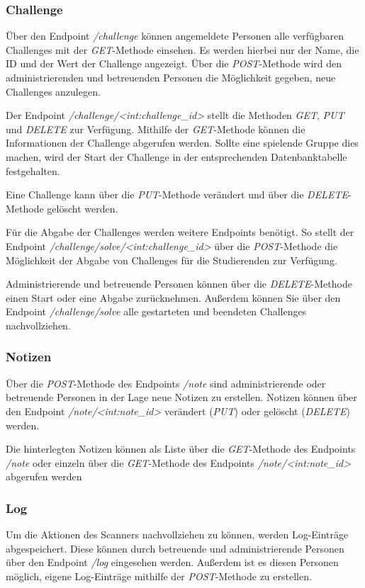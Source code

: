 \subsubsection{Challenge}
Über den Endpoint \textit{/challenge} können angemeldete Personen alle verfügbaren Challenges mit der \textit{GET}-Methode einsehen. Es werden hierbei nur der Name, die ID und der Wert der Challenge angezeigt. Über die \textit{POST}-Methode wird den administrierenden und betreuenden Personen die Möglichkeit gegeben, neue Challenges anzulegen.

Der Endpoint \textit{/challenge/<int:challenge\_id>} stellt die Methoden \textit{GET}, \textit{PUT} und \textit{DELETE} zur Verfügung. Mithilfe der \textit{GET}-Methode können die Informationen der Challenge abgerufen werden. Sollte eine spielende Gruppe dies machen, wird der Start der Challenge in der entsprechenden Datenbanktabelle festgehalten.

Eine Challenge kann über die \textit{PUT}-Methode verändert und über die \textit{DELETE}-Methode gelöscht werden.

Für die Abgabe der Challenges werden weitere Endpoints benötigt. So stellt der Endpoint \textit{/challenge/solve/<int:challenge\_id>} über die \textit{POST}-Methode die Möglichkeit der Abgabe von Challenges für die Studierenden zur Verfügung.

Administrierende und betreuende Personen können über die \textit{DELETE}-Methode einen Start oder eine Abgabe zurücknehmen. Außerdem können Sie über den Endpoint \textit{/challenge/solve} alle gestarteten und beendeten Challenges nachvollziehen.

\subsubsection{Notizen}
Über die \textit{POST}-Methode des Endpoints \textit{/note} sind administrierende oder betreuende Personen in der Lage neue Notizen zu erstellen. Notizen können über den Endpoint \textit{/note/<int:note\_id>} verändert (\textit{PUT}) oder gelöscht (\textit{DELETE}) werden.

Die hinterlegten Notizen können als Liste über die \textit{GET}-Methode des Endpoints \textit{/note} oder einzeln über die \textit{GET}-Methode des Endpoints \textit{/note/<int:note\_id>} abgerufen werden

\subsubsection{Log}
Um die Aktionen des Scanners nachvollziehen zu können, werden Log-Einträge abgespeichert. Diese können durch betreuende und administrierende Personen über den Endpoint \textit{/log} eingesehen werden. Außerdem ist es diesen Personen möglich, eigene Log-Einträge mithilfe der \textit{POST}-Methode zu erstellen.

